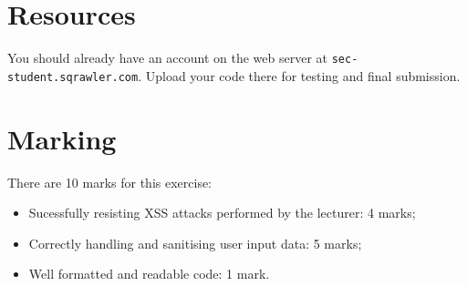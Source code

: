 \documentclass{article}
\begin{document}
\section{Resources}
You should already have an account on the web server at \texttt{sec-student.sqrawler.com}.
Upload your code there for testing and final submission.

\newpage

\section{Marking}

There are 10 marks for this exercise:

\begin{itemize}
	\item Sucessfully resisting XSS attacks performed by the lecturer: 4 marks;
	\item Correctly handling and sanitising user input data: 5 marks;
	\item Well formatted and readable code: 1 mark.
\end{itemize}
\end{document}

